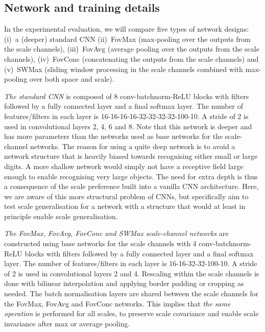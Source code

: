 \documentclass[twocolumn,runningheads]{svjour3}
\begin{document}
\subsection{Network and training details}

In the experimental evaluation, we will compare five types of network
designs:
(i)~a (deeper) standard CNN 
(ii)~FovMax (max-pooling over the outputs from the scale channels),
(iii)~FovAvg (average pooling over the outputs from the scale channels),
(iv)~FovConc (concatenating the outputs from the scale channels) and
(v)~SWMax (sliding window processing in the scale channels combined with max-pooling over both space and scale).

{\em The standard CNN\/} is composed of 8 conv-batchnorm-ReLU blocks with  filters
followed by a fully connected layer and a final softmax layer. The
number of features/filters in each layer is
16-16-16-16-32-32-32-32-100-10. A stride of 2 is used in convolutional
layers 2, 4, 6 and 8. Note that this network is deeper and has more parameters than the networks used as base networks for the scale-channel networks. The reason for using a quite deep network is to
avoid a network structure that is heavily biased towards recognising
either small or large digits. A more shallow network would simply not have a receptive field large enough to enable recognising very large objects. The need for extra depth is thus a consequence of the scale preference built into a vanilla CNN architecture. Here, we are aware of this more structural problem of CNNs, but specifically aim to test scale generalisation for a network with a structure that would at least in principle enable scale generalisation.

{\em The FovMax, FovAvg, FovConc and SWMax \/}{\em scale-channel networks} are constructed using base networks for the scale channels with
4 conv-batchnorm-ReLU blocks with  filters followed by a fully connected layer and a
final softmax layer. The number of features/filters in each layer is 16-16-32-32-100-10. A
stride of 2 is used in convolutional layers 2 and 4. Rescaling within the scale channels is done with
bilinear interpolation and applying border padding or cropping as
needed. The batch normalisation layers are shared between the scale channels for the FovMax, FovAvg and FovConc networks. This implies that \emph{the same operation} is performed for all scales, to preserve scale covariance and enable scale invariance after max or average pooling.
\end{document}
